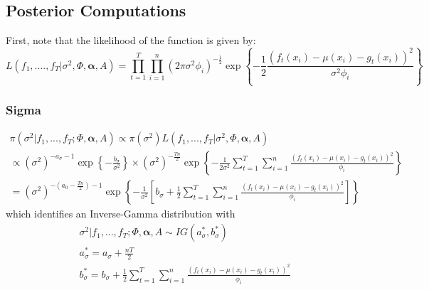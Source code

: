 \subsection{Posterior Computations}
First, note that the likelihood of the function is given by: 
\begin{equation}
    L(f_1, ...., f_T | \sigma^2, \Phi, \boldsymbol{\alpha}, A) = \prod_{t=1}^T \prod_{i=1}^n (2 \pi \sigma^2 \phi_i)^{-\frac{1}{2}} \exp \left\{- \frac{1}{2} \frac{\left(f_t(x_i) - \mu(x_i) - g_t(x_i)\right)^2}{\sigma^2 \phi_i} \right\}
\end{equation}

\subsubsection{Sigma}
\begin{gather}
    \pi(\sigma^2 | f_1, ..., f_T ; \Phi, \boldsymbol{\alpha}, A) \propto \pi(\sigma^2) L(f_1, ..., f_T | \sigma^2, \Phi, \boldsymbol{\alpha}, A) \\
    \propto(\sigma^2)^{- a_\sigma - 1} \exp \left\{-\frac{b_\sigma}{\sigma^2} \right\} \times (\sigma^2)^{-\frac{Tn}{2}} \exp \left\{- \frac{1}{2 \sigma^2} \sum_{t=1}^T \sum_{i=1}^n \frac{(f_t(x_i) - \mu(x_i) - g_t(x_i))^2}{\phi_i} \right\} \\
    = (\sigma^2)^{-(a_0 - \frac{Tn}{2}) - 1} \exp \left\{ -\frac{1}{\sigma^2} \left[b_\sigma + \frac{1}{2} \sum_{t=1}^T \sum_{i=1}^n \frac{(f_t(x_i) - \mu(x_i) - g_t(x_i))^2}{\phi_i} \right] \right\}
\end{gather}
which identifies an Inverse-Gamma distribution with 
\begin{gather*}
    \sigma^2 | f_1, ..., f_T; \Phi, \boldsymbol{\alpha}, A \sim IG(a_\sigma^*, b_\sigma^*) \\
    a_\sigma^* = a_\sigma + \frac{nT}{2} \\
    b_\sigma^* = b_\sigma + \frac{1}{2} \sum_{t=1}^T \sum_{i=1}^n \frac{(f_t(x_i) - \mu(x_i) - g_t(x_i))^2}{\phi_i}
\end{gather*}

